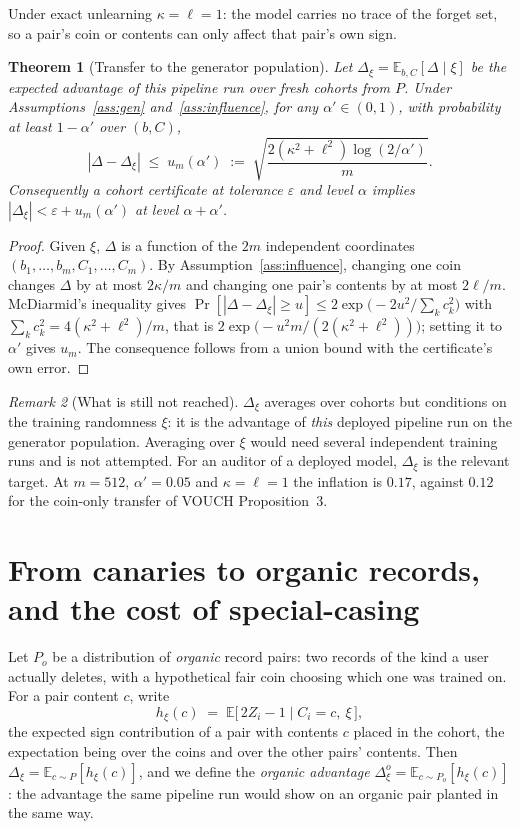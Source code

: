 \documentclass[11pt]{article}
\newtheorem{theorem}{Theorem}
\theoremstyle{definition}
\theoremstyle{remark}
\newtheorem{remark}[theorem]{Remark}
\newcommand{\eps}{\varepsilon}
\newcommand{\E}{\mathbb{E}}
\begin{document}
Under exact unlearning $\kappa=\ell=1$: the model carries no trace of the forget set,
so a pair's coin or contents can only affect that pair's own sign.

\begin{theorem}[Transfer to the generator population]\label{thm:population}
Let $\Delta_\xi = \E_{b,C}[\Delta\mid\xi]$ be the expected advantage of this pipeline
run over fresh cohorts from $P$. Under Assumptions~\ref{ass:gen}
and~\ref{ass:influence}, for any $\alpha'\in(0,1)$, with probability at least
$1-\alpha'$ over $(b,C)$,
\[
|\Delta - \Delta_\xi| \;\le\; u_m(\alpha') \;:=\;
\sqrt{\frac{2(\kappa^2+\ell^2)\log(2/\alpha')}{m}} .
\]
Consequently a cohort certificate at tolerance $\eps$ and level $\alpha$ implies
$|\Delta_\xi| < \eps + u_m(\alpha')$ at level $\alpha+\alpha'$.
\end{theorem}

\begin{proof}
Given $\xi$, $\Delta$ is a function of the $2m$ independent coordinates
$(b_1,\dots,b_m,C_1,\dots,C_m)$. By Assumption~\ref{ass:influence}, changing one
coin changes $\Delta$ by at most $2\kappa/m$ and changing one pair's contents by at
most $2\ell/m$. McDiarmid's inequality gives
$\Pr[|\Delta-\Delta_\xi|\ge u]\le 2\exp\bigl(-2u^2/\sum_k c_k^2\bigr)$ with
$\sum_k c_k^2 = 4(\kappa^2+\ell^2)/m$, that is
$2\exp\bigl(-u^2m/(2(\kappa^2+\ell^2))\bigr)$; setting it to $\alpha'$ gives $u_m$.
The consequence follows from a union bound with the certificate's own error.
\end{proof}

\begin{remark}[What is still not reached]
$\Delta_\xi$ averages over cohorts but conditions on the training randomness $\xi$:
it is the advantage of \emph{this} deployed pipeline run on the generator
population. Averaging over $\xi$ would need several independent training runs and is
not attempted. For an auditor of a deployed model, $\Delta_\xi$ is the relevant
target. At $m=512$, $\alpha'=0.05$ and $\kappa=\ell=1$ the inflation is $0.17$,
against $0.12$ for the coin-only transfer of VOUCH Proposition~3.
\end{remark}

\section{From canaries to organic records, and the cost of special-casing}

Let $P_o$ be a distribution of \emph{organic} record pairs: two records of the kind a
user actually deletes, with a hypothetical fair coin choosing which one was trained
on. For a pair content $c$, write
\[
h_\xi(c) \;=\; \E\bigl[\,2Z_i - 1 \;\big|\; C_i = c,\ \xi\,\bigr],
\]
the expected sign contribution of a pair with contents $c$ placed in the cohort, the
expectation being over the coins and over the other pairs' contents. Then
$\Delta_\xi = \E_{c\sim P}[h_\xi(c)]$, and we define the \emph{organic advantage}
$\Delta^o_\xi = \E_{c\sim P_o}[h_\xi(c)]$: the advantage the same pipeline run would
show on an organic pair planted in the same way.
\end{document}
